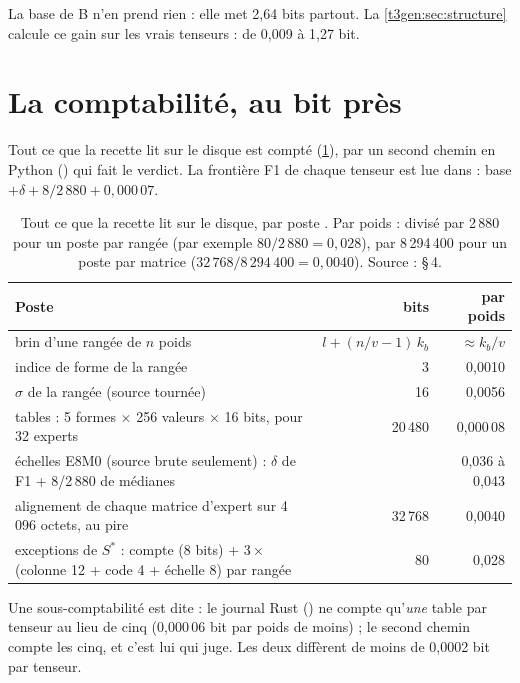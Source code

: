 La base de B n'en prend rien : elle met 2,64 bits partout. La \cref{t3gen:sec:structure} calcule ce gain sur les vrais tenseurs : de 0,009 à 1,27 bit.

\section{La comptabilité, au bit près}\label{t3gen:sec:compta}

Tout ce que la recette lit sur le disque est compté (\cref{t3gen:tab:compta}), par un second chemin en Python () qui fait le verdict. La frontière F1 de chaque tenseur est lue dans  : base $+ \delta + 8/2\,880 + 0{,}000\,07$.

\begin{table}[tbp]
\centering\footnotesize\setlength{\tabcolsep}{3pt}
\begin{tabularx}{\linewidth}{@{}>{\raggedright\arraybackslash}X r r@{}}
\toprule
Poste & bits & par poids \\
\midrule
brin d'une rangée de $n$ poids & $l + (n/v - 1)\,k_b$ & $\approx k_b/v$ \\
indice de forme de la rangée & 3 & 0,0010 \\
$\sigma$ de la rangée (source tournée) & 16 & 0,0056 \\
tables : 5 formes $\times$ 256 valeurs $\times$ 16 bits, pour 32 experts & 20\,480 & 0,000\,08 \\
échelles E8M0 (source brute seulement) : $\delta$ de F1 + 8/2\,880 de médianes & & 0,036 à 0,043 \\
alignement de chaque matrice d'expert sur 4\,096 octets, au pire & 32\,768 & 0,0040 \\
exceptions de $S^{*}$ : compte (8 bits) + $3 \times$ (colonne 12 + code 4 + échelle 8) par rangée & 80 & 0,028 \\
\bottomrule
\end{tabularx}
\caption[La comptabilité de la recette]{Tout ce que la recette lit sur le disque, par poste \calc. Par poids : divisé par 2\,880 pour un poste par rangée (par exemple $80/2\,880 = 0{,}028$), par 8\,294\,400 pour un poste par matrice ($32\,768/8\,294\,400 = 0{,}0040$). Source :  §\,4.}
\label{t3gen:tab:compta}
\end{table}

Une sous-comptabilité est dite : le journal Rust () ne compte qu'\emph{une} table par tenseur au lieu de cinq (0,000\,06 bit par poids de moins) ; le second chemin compte les cinq, et c'est lui qui juge. Les deux diffèrent de moins de 0,0002 bit par tenseur.

